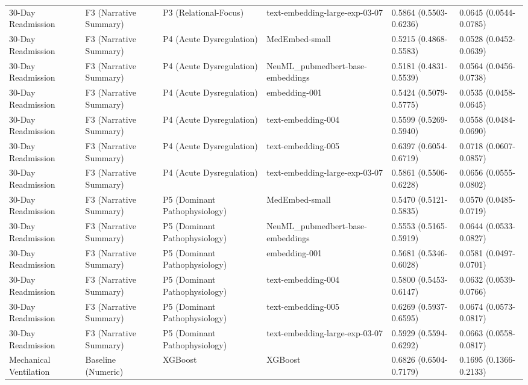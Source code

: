 \begin{tabular}{llllll}
30-Day Readmission & F3 (Narrative Summary) & P3 (Relational-Focus) & text-embedding-large-exp-03-07 & 0.5864 (0.5503-0.6236) & 0.0645 (0.0544-0.0785) \\
30-Day Readmission & F3 (Narrative Summary) & P4 (Acute Dysregulation) & MedEmbed-small & 0.5215 (0.4868-0.5583) & 0.0528 (0.0452-0.0639) \\
30-Day Readmission & F3 (Narrative Summary) & P4 (Acute Dysregulation) & NeuML\_pubmedbert-base-embeddings & 0.5181 (0.4831-0.5539) & 0.0564 (0.0456-0.0738) \\
30-Day Readmission & F3 (Narrative Summary) & P4 (Acute Dysregulation) & embedding-001 & 0.5424 (0.5079-0.5775) & 0.0535 (0.0458-0.0645) \\
30-Day Readmission & F3 (Narrative Summary) & P4 (Acute Dysregulation) & text-embedding-004 & 0.5599 (0.5269-0.5940) & 0.0558 (0.0484-0.0690) \\
30-Day Readmission & F3 (Narrative Summary) & P4 (Acute Dysregulation) & text-embedding-005 & 0.6397 (0.6054-0.6719) & 0.0718 (0.0607-0.0857) \\
30-Day Readmission & F3 (Narrative Summary) & P4 (Acute Dysregulation) & text-embedding-large-exp-03-07 & 0.5861 (0.5506-0.6228) & 0.0656 (0.0555-0.0802) \\
30-Day Readmission & F3 (Narrative Summary) & P5 (Dominant Pathophysiology) & MedEmbed-small & 0.5470 (0.5121-0.5835) & 0.0570 (0.0485-0.0719) \\
30-Day Readmission & F3 (Narrative Summary) & P5 (Dominant Pathophysiology) & NeuML\_pubmedbert-base-embeddings & 0.5553 (0.5165-0.5919) & 0.0644 (0.0533-0.0827) \\
30-Day Readmission & F3 (Narrative Summary) & P5 (Dominant Pathophysiology) & embedding-001 & 0.5681 (0.5346-0.6028) & 0.0581 (0.0497-0.0701) \\
30-Day Readmission & F3 (Narrative Summary) & P5 (Dominant Pathophysiology) & text-embedding-004 & 0.5800 (0.5453-0.6147) & 0.0632 (0.0539-0.0766) \\
30-Day Readmission & F3 (Narrative Summary) & P5 (Dominant Pathophysiology) & text-embedding-005 & 0.6269 (0.5937-0.6595) & 0.0674 (0.0573-0.0817) \\
30-Day Readmission & F3 (Narrative Summary) & P5 (Dominant Pathophysiology) & text-embedding-large-exp-03-07 & 0.5929 (0.5594-0.6292) & 0.0663 (0.0558-0.0817) \\
Mechanical Ventilation & Baseline (Numeric) & XGBoost & XGBoost & 0.6826 (0.6504-0.7179) & 0.1695 (0.1366-0.2133) \\

\end{tabular}
